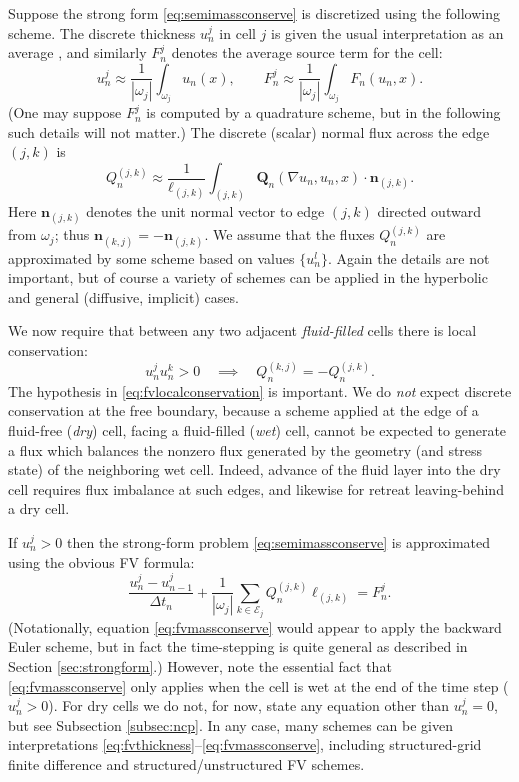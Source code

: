 \documentclass[final,onefignum]{siamart190516}
\newcommand\bn{\mathbf{n}}
\newcommand\bQ{\mathbf{Q}}
\newcommand{\grad}{\nabla}
\begin{document}
Suppose the strong form \eqref{eq:semimassconserve} is discretized using the following scheme.  The discrete thickness $u_n^j$ in cell $j$ is given the usual interpretation as an average \cite{LeVeque2002}, and similarly $F_n^j$ denotes the average source term for the cell:
\begin{equation}
u_n^j \approx \frac{1}{|\omega_j|} \int_{\omega_j} u_n(x), \qquad F_n^j \approx \frac{1}{|\omega_j|} \int_{\omega_j} F_n(u_n,x).  \label{eq:fvthickness}
\end{equation}
(One may suppose $F_n^j$ is computed by a quadrature scheme, but in the following such details will not matter.)  The discrete (scalar) normal flux across the edge $(j,k)$ is
\begin{equation}
Q_n^{(j,k)} \approx \frac{1}{\ell_{(j,k)}} \int_{(j,k)} \bQ_n(\grad u_n,u_n,x) \cdot \bn_{(j,k)}. \label{eq:fvflux}
\end{equation}
Here $\bn_{(j,k)}$ denotes the unit normal vector to edge $(j,k)$ directed outward from $\omega_j$; thus $\bn_{(k,j)} = -\bn_{(j,k)}$.  We assume that the fluxes $Q_n^{(j,k)}$ are approximated by some scheme based on values $\{u_n^l\}$.  Again the details are not important, but of course a variety of schemes can be applied in the hyperbolic \cite{LeVeque2002} and general (diffusive, implicit) \cite{Morton2018} cases.

We now require that between any two adjacent \emph{fluid-filled} cells there is local conservation:
\begin{equation}
  u_n^j u_n^k > 0 \quad \implies \quad Q_n^{(k,j)}=-Q_n^{(j,k)}.  \label{eq:fvlocalconservation}
\end{equation}
The hypothesis in \eqref{eq:fvlocalconservation} is important.  We do \emph{not} expect discrete conservation at the free boundary, because a scheme applied at the edge of a fluid-free (\emph{dry}) cell, facing a fluid-filled (\emph{wet}) cell, cannot be expected to generate a flux which balances the nonzero flux generated by the geometry (and stress state) of the neighboring wet cell.  Indeed, advance of the fluid layer into the dry cell requires flux imbalance at such edges, and likewise for retreat leaving-behind a dry cell.

If $u_n^j>0$ then the strong-form problem \eqref{eq:semimassconserve} is approximated using the obvious FV formula:
\begin{equation}
\frac{u_n^j - u_{n-1}^j}{\Delta t_n} + \frac{1}{|\omega_j|} \sum_{k\in \mathcal{E}_j} Q_n^{(j,k)} \ell_{(j,k)} = F_n^j. \label{eq:fvmassconserve}
\end{equation}
(Notationally, equation \eqref{eq:fvmassconserve} would appear to apply the backward Euler scheme, but in fact the time-stepping is quite general as described in Section \ref{sec:strongform}.)  However, note the essential fact that \eqref{eq:fvmassconserve} only applies when the cell is wet at the end of the time step ($u_n^j>0$).  For dry cells we do not, for now, state any equation other than $u_n^j=0$, but see Subsection \ref{subsec:ncp}.  In any case, many schemes can be given interpretations \eqref{eq:fvthickness}--\eqref{eq:fvmassconserve}, including structured-grid finite difference \cite{Bueler2016} and structured/unstructured FV \cite{LeVeque2002} schemes.
\end{document}
